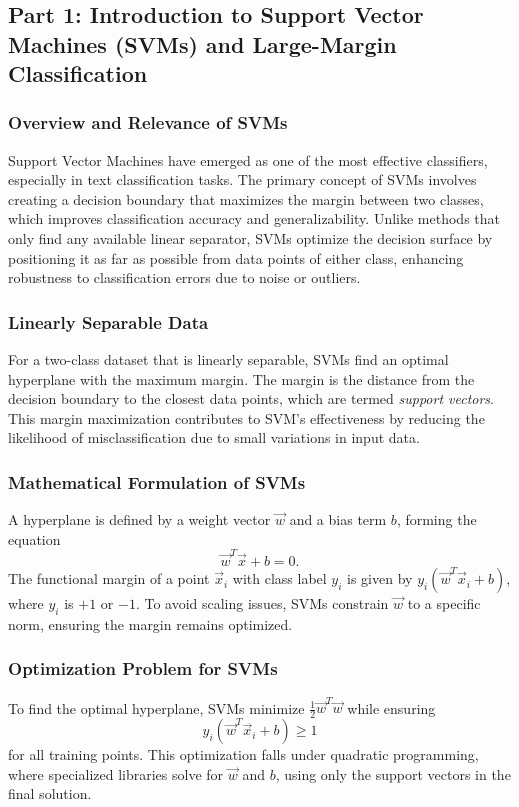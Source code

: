 \documentclass{article}
\begin{document}
\section*{}

\subsection*{Part 1: Introduction to Support Vector Machines (SVMs) and Large-Margin Classification}

\subsubsection*{Overview and Relevance of SVMs}
Support Vector Machines have emerged as one of the most effective classifiers, especially in text classification tasks. The primary concept of SVMs involves creating a decision boundary that maximizes the margin between two classes, which improves classification accuracy and generalizability. Unlike methods that only find any available linear separator, SVMs optimize the decision surface by positioning it as far as possible from data points of either class, enhancing robustness to classification errors due to noise or outliers.

\subsubsection*{Linearly Separable Data}
For a two-class dataset that is linearly separable, SVMs find an optimal hyperplane with the maximum margin. The margin is the distance from the decision boundary to the closest data points, which are termed \emph{support vectors}. This margin maximization contributes to SVM's effectiveness by reducing the likelihood of misclassification due to small variations in input data.

\subsubsection*{Mathematical Formulation of SVMs}
A hyperplane is defined by a weight vector \( \vec{w} \) and a bias term \( b \), forming the equation
\[
\vec{w}^T \vec{x} + b = 0.
\]
The functional margin of a point \( \vec{x}_i \) with class label \( y_i \) is given by \( y_i (\vec{w}^T \vec{x}_i + b) \), where \( y_i \) is \( +1 \) or \( -1 \). To avoid scaling issues, SVMs constrain \( \vec{w} \) to a specific norm, ensuring the margin remains optimized.

\subsubsection*{Optimization Problem for SVMs}
To find the optimal hyperplane, SVMs minimize \( \frac{1}{2} \vec{w}^T \vec{w} \) while ensuring
\[
y_i (\vec{w}^T \vec{x}_i + b) \geq 1
\]
for all training points. This optimization falls under quadratic programming, where specialized libraries solve for \( \vec{w} \) and \( b \), using only the support vectors in the final solution.
\end{document}

